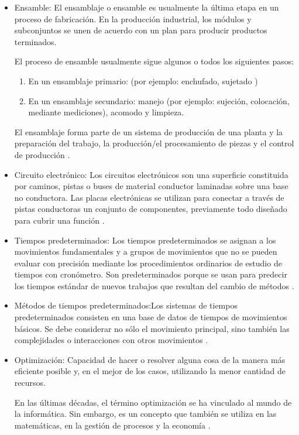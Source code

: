         \begin{itemize}
            \item Ensamble: El ensamblaje o ensamble es usualmente la última etapa en un proceso de fabricación. En la producción industrial, los módulos y subconjuntos se unen de acuerdo con un plan para producir productos terminados. 
        
            El proceso de ensamble usualmente sigue algunos o todos los siguientes pasos:
            
        \begin{enumerate}
            \item En un ensamblaje primario: (por ejemplo: enchufado, sujetado )
            \item En un ensamblaje secundario: manejo (por ejemplo: sujeción, colocación, mediante mediciones), acomodo y limpieza.
        \end{enumerate}
    
            El ensamblaje forma parte de un sistema de producción de una planta y la preparación del trabajo, la producción/el procesamiento de piezas y el control de producción  \cite{glossar_item24}.
        
            \item Circuito electrónico: Los circuitos electrónicos son una superficie constituida por caminos, pistas o buses de material conductor laminadas sobre una base no conductora. Las placas electrónicas se utilizan para conectar a través de pistas conductoras un conjunto de componentes, previamente todo diseñado para cubrir una función  \cite{fadesaing_circuitos}.
        
            \item Tiempos predeterminados:
            Los tiempos predeterminados se asignan a los movimientos fundamentales y a grupos de movimientos que no se pueden evaluar con precisión mediante los procedimientos ordinarios de estudio de tiempos con cronómetro. 
            Son predeterminados porque se usan para predecir los tiempos estándar de nuevos trabajos que resultan del cambio de métodos  \cite{pozarica_uo_estudio_trabajo}. 
           
            \item Métodos de tiempos predeterminados:Los sistemas de tiempos predeterminados consisten en una base de datos de tiempos de movimientos básicos. Se debe considerar no sólo el movimiento principal, sino también las complejidades o interacciones con otros movimientos   \cite{pozarica_uo_estudio_trabajo}.
       
            \item Optimización: Capacidad de hacer o resolver alguna cosa de la manera más eficiente posible y, en el mejor de los casos, utilizando la menor cantidad de recursos.
    
            En las últimas décadas, el término optimización se ha vinculado al mundo de la informática. Sin embargo, es un concepto que también se utiliza en las matemáticas, en la gestión de procesos y la economía  \cite{significados_optimizacion}.
        
        \end{itemize}
    
